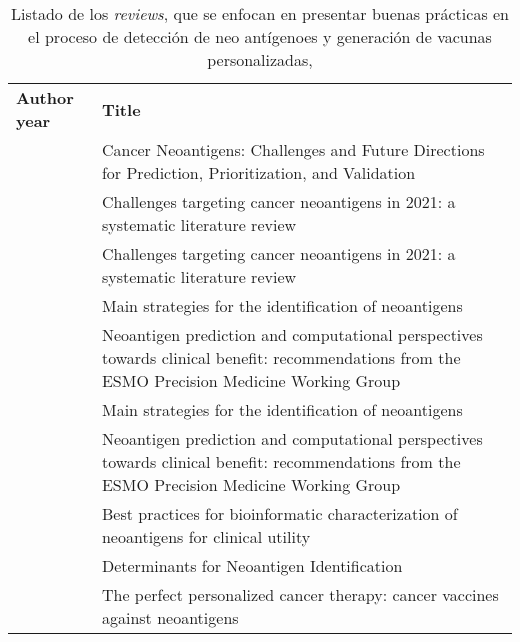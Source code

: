 \begin{table}[]
	\caption{Listado de los \textit{reviews}, que se enfocan en presentar buenas prácticas en el proceso de detección de neo antígenoes y generación de vacunas personalizadas,}
	\label{tab:review_buen}
	\begin{tabular}{p{3cm}p{10cm}}
		\textbf{Author year}                            & \textbf{Title}                                                                                                                                \\
		\cite{borden2022cancer}       & Cancer Neoantigens: Challenges and Future Directions for Prediction, Prioritization, and Validation                                           \\
		\cite{chen2021challenges}     & Challenges targeting cancer neoantigens in 2021: a systematic literature review                                                               \\
		\cite{chen2021challenges}     & Challenges targeting cancer neoantigens in 2021: a systematic literature review                                                               \\
		\cite{gopanenko2020main}      & Main strategies for the identification of neoantigens                                                                                         \\
		\cite{de2020neoantigen}       & Neoantigen prediction and computational perspectives towards clinical benefit: recommendations from the ESMO Precision Medicine Working Group \\
		\cite{gopanenko2020main}      & Main strategies for the identification of neoantigens                                                                                         \\
		\cite{de2020neoantigen}       & Neoantigen prediction and computational perspectives towards clinical benefit: recommendations from the ESMO Precision Medicine Working Group \\
		\cite{richters2019best}       & Best practices for bioinformatic characterization of neoantigens for clinical utility                                                         \\
		\cite{garcia2019determinants} & Determinants for Neoantigen Identification                                                                                                    \\
		\cite{aurisicchio2018perfect} & The perfect personalized cancer therapy: cancer vaccines against neoantigens                                                                  \\

\end{tabular}
\end{table}
